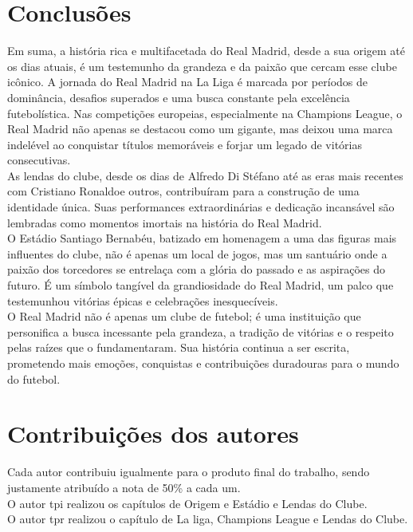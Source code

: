 \documentclass{report}
\begin{document}

\chapter{Conclusões}
\label{chap.conclusao}
Em suma, a história rica e multifacetada do Real Madrid, desde a sua origem até os dias atuais, é um testemunho da grandeza e da paixão que cercam esse clube icônico. A jornada do Real Madrid na La Liga é marcada por períodos de dominância, desafios superados e uma busca constante pela excelência futebolística. Nas competições europeias, especialmente na Champions League, o Real Madrid não apenas se destacou como um gigante, mas deixou uma marca indelével ao conquistar títulos memoráveis e forjar um legado de vitórias consecutivas.
\\

As lendas do clube, desde os dias de Alfredo Di Stéfano até as eras mais recentes com Cristiano Ronaldoe outros, contribuíram para a construção de uma identidade única. Suas performances extraordinárias e dedicação incansável são lembradas como momentos imortais na história do Real Madrid.
\\

O Estádio Santiago Bernabéu, batizado em homenagem a uma das figuras mais influentes do clube, não é apenas um local de jogos, mas um santuário onde a paixão dos torcedores se entrelaça com a glória do passado e as aspirações do futuro. É um símbolo tangível da grandiosidade do Real Madrid, um palco que testemunhou vitórias épicas e celebrações inesquecíveis.
\\

O Real Madrid não é apenas um clube de futebol; é uma instituição que personifica a busca incessante pela grandeza, a tradição de vitórias e o respeito pelas raízes que o fundamentaram. Sua história continua a ser escrita, prometendo mais emoções, conquistas e contribuições duradouras para o mundo do futebol.


\chapter*{Contribuições dos autores}
Cada autor contribuiu igualmente para o produto final do trabalho, sendo justamente atribuído a nota de 50\% a cada um. \\
O autor \ac{tpi} realizou os capítulos de Origem e Estádio e Lendas do Clube. \\
O autor \ac{tpr} realizou o capítulo de La liga, Champions League e Lendas do Clube.
\end{document}
